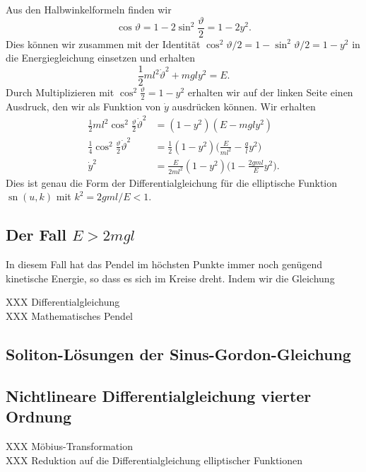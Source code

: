 Aus den Halbwinkelformeln finden wir
\[
\cos\vartheta
=
1-2\sin^2 \frac{\vartheta}2
=
1-2y^2.
\]
Dies können wir zusammen mit der
Identität $\cos^2\vartheta/2 = 1-\sin^2\vartheta/2 = 1-y^2$
in die Energiegleichung einsetzen und erhalten
\[
\frac12ml^2\dot{\vartheta}^2 + mgly^2 = E.
\]
Durch Multiplizieren mit $\cos^2\frac{\vartheta}{2}=1-y^2$
erhalten wir auf der linken Seite einen Ausdruck, den wir
als Funktion von $\dot{y}$ ausdrücken können.
Wir erhalten
\begin{align*}
\frac12ml^2
\cos^2\frac{\vartheta}2
\dot{\vartheta}^2
&=
(1-y^2)
(E -mgly^2)
\\
\frac{1}{4}\cos^2\frac{\vartheta}{2}\dot{\vartheta}^2
&=
\frac{1}{2}
(1-y^2)
\biggl(\frac{E}{ml^2} -\frac{g}{l}y^2\biggr)
\\
\dot{y}^2
&=
\frac{E}{2ml^2}
(1-y^2)\biggl(
1-\frac{2gml}{E}y^2
\biggr).
\end{align*}
Dies ist genau die Form der Differentialgleichung für die elliptische
Funktion $\operatorname{sn}(u,k)$
mit $k^2 = 2gml/E< 1$.

%
%
\subsection{Der Fall $E > 2mgl$}
In diesem Fall hat das Pendel im höchsten Punkte immer noch genügend
kinetische Energie, so dass es sich im Kreise dreht.
Indem wir die Gleichung

XXX Differentialgleichung \\
XXX Mathematisches Pendel \\

\subsection{Soliton-Lösungen der Sinus-Gordon-Gleichung}

\subsection{Nichtlineare Differentialgleichung vierter Ordnung}
XXX Möbius-Transformation \\
XXX Reduktion auf die Differentialgleichung elliptischer Funktionen
